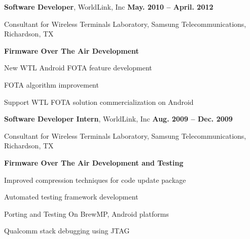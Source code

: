 \documentclass[overlapped, line]{resume}
\begin{document}
\begin{resume}
         {\bf Software Developer}, WorldLink, Inc \hfill {\bf May. 2010 -- April. 2012}\\
         \vspace{-10pt}      %
         \begin{list2}
         \item Consultant for Wireless Terminals Laboratory, Samsung Telecommunications, Richardson, TX
         \item \textbf{Firmware Over The Air Development}
           \begin{list2}
           \item New WTL Android FOTA feature development
           \item FOTA algorithm improvement
           \end{list2}
           \item Support WTL FOTA solution commercialization on Android
         \end{list2}  \vspace{-5pt}

         {\bf Software Developer Intern}, WorldLink, Inc \hfill {\bf Aug. 2009 -- Dec. 2009}\\
         \vspace{-10pt}      %
         \begin{list2}
         \item Consultant for Wireless Terminals Laboratory, Samsung Telecommunications, Richardson, TX
         \item \textbf{Firmware Over The Air Development and Testing}
           \begin{list2}
           \item Improved compression techniques for code update package
           \item Automated testing framework development
           \item Porting and Testing On BrewMP, Android platforms
           \item Qualcomm stack debugging using JTAG
           \end{list2}

         \end{list2}  \vspace{-5pt}



\end{resume}
\end{document}
